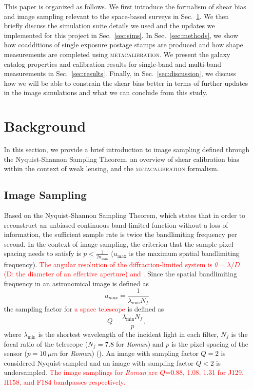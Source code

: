 \documentclass[fleqn,usenatbib]{mnras}
\begin{document}
This paper is organized as follows. We first introduce the formalism of shear bias and image sampling relevant to the space-based surveys in Sec.~\ref{sec:background}. We then briefly discuss the simulation suite details we used and the updates we implemented for this project in Sec.~\ref{sec:sims}. In Sec.~\ref{sec:methods}, we show how coadditions of single exposure postage stamps are produced and how shape measurements are completed using \textsc{metacalibration}. We present the galaxy catalog properties and calibration results for single-band and multi-band measurements in Sec.~\ref{sec:results}. Finally, in Sec.~\ref{sec:discussion}, we discuss how we will be able to constrain the shear bias better in terms of further updates in the image simulations and what we can conclude from this study. 

\section{Background}
\label{sec:background}
In this section, we provide a brief introduction to image sampling defined through the Nyquist-Shannon Sampling Theorem, an overview of shear calibration bias within the context of weak lensing, and the \textsc{metacalibration} formalism.


\subsection{Image Sampling}
Based on the Nyquist-Shannon Sampling Theorem, which states that in order to reconstruct an unbiased continuous band-limited function without a loss of information, the sufficient sample rate is twice the bandlimiting frequency per second. In the context of image sampling, the criterion that the sample pixel spacing needs to satisfy is $p < \frac{1}{2u_{\text{max}}}$ ($u_{\text{max}}$ is the maximum spatial bandlimiting frequency). \textcolor{red}{The angular resolution of the diffraction-limited system is $\theta = \lambda/D$ (D: the diameter of an effective aperture) and .} Since the spatial bandlimiting frequency in an astronomical image is defined as 
\begin{equation}
    u_{max} = \frac{1}{\lambda_{\text{min}}N_{f}}
\end{equation}
the sampling factor for \textcolor{red}{a space telescope} is defined as 
\begin{equation}
    Q = \frac{\lambda_{\text{min}}N_{f}}{p}, 
    \label{eqn:sampling}
\end{equation}
where $\lambda_{\text{min}}$ is the shortest wavelength of the incident light in each filter, $N_{f}$ is the focal ratio of the telescope ($N_{f}=7.8$ for \emph{Roman}) and $p$ is the pixel spacing of the sensor ($p=10\,\mu m$ for \emph{Roman}) (\citealt{2013PASP..125.1496S}). An image with sampling factor $Q=2$ is considered Nyquist-sampled and an image with sampling factor $Q<2$ is undersampled. \textcolor{red}{The image samplings for \emph{Roman} are $Q$=0.88, 1.08, 1.31 for J129, H158, and F184 bandpasses respectively. } 
\end{document}
